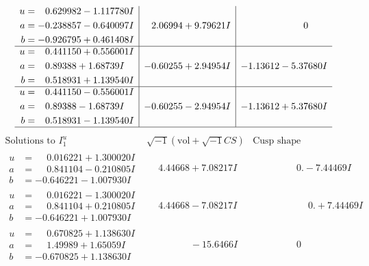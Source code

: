 \documentclass[1p]{elsarticle_modified}
\theoremstyle{definition}
\newcommand{\I}{\sqrt{-1}}
\begin{document}
$$\begin{array}{c|c|c}
\begin{aligned}
u &= \phantom{-}0.629982 - 1.117780 I \\
a &= -0.238857 - 0.640097 I \\
b &= -0.926795 + 0.461408 I\end{aligned}
 & \phantom{-}2.06994 + 9.79621 I & \phantom{-0.000000 } 0 \\ \hline\begin{aligned}
u &= \phantom{-}0.441150 + 0.556001 I \\
a &= \phantom{-}0.89388 + 1.68739 I \\
b &= \phantom{-}0.518931 + 1.139540 I\end{aligned}
 & -0.60255 + 2.94954 I & -1.13612 - 5.37680 I \\ \hline\begin{aligned}
u &= \phantom{-}0.441150 - 0.556001 I \\
a &= \phantom{-}0.89388 - 1.68739 I \\
b &= \phantom{-}0.518931 - 1.139540 I\end{aligned}
 & -0.60255 - 2.94954 I & -1.13612 + 5.37680 I\\
 \hline 
 \end{array}$$\newpage$$\begin{array}{c|c|c}  
\text{Solutions to }I^u_{1}& \I (\text{vol} + \sqrt{-1}CS) & \text{Cusp shape}\\
 \hline 
\begin{aligned}
u &= \phantom{-}0.016221 + 1.300020 I \\
a &= \phantom{-}0.841104 - 0.210805 I \\
b &= -0.646221 - 1.007930 I\end{aligned}
 & \phantom{-}4.44668 + 7.08217 I & \phantom{-0.000000 } 0. - 7.44469 I \\ \hline\begin{aligned}
u &= \phantom{-}0.016221 - 1.300020 I \\
a &= \phantom{-}0.841104 + 0.210805 I \\
b &= -0.646221 + 1.007930 I\end{aligned}
 & \phantom{-}4.44668 - 7.08217 I & \phantom{-0.000000 -}0. + 7.44469 I \\ \hline\begin{aligned}
u &= \phantom{-}0.670825 + 1.138630 I \\
a &= \phantom{-}1.49989 + 1.65059 I \\
b &= -0.670825 + 1.138630 I\end{aligned}
 & \phantom{-0.000000 } -15.6466 I & \phantom{-0.000000 } 0 \\ \hline\begin{aligned}

\end{aligned}
\end{array}$$
\end{document}
